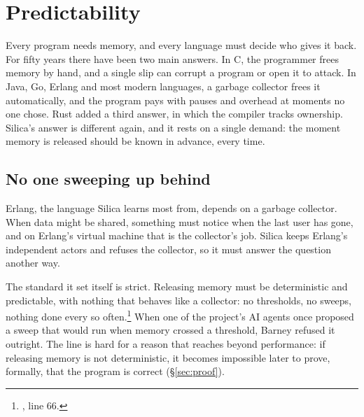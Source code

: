 \chapter{Predictability}
\label{ch:memory}

Every program needs memory, and every language must decide who gives it back.
For fifty years there have been two main answers. In C, the programmer frees
memory by hand, and a single slip can corrupt a program or open it to attack.
In Java, Go, Erlang and most modern languages, a garbage collector frees it
automatically, and the program pays with pauses and overhead at moments no one
chose. Rust added a third answer, in which the compiler tracks ownership.
Silica's answer is different again, and it rests on a single demand: the
moment memory is released should be known in advance, every time.

\section{No one sweeping up behind}

Erlang, the language Silica learns most from, depends on a garbage collector.
When data might be shared, something must notice when the last user has gone,
and on Erlang's virtual machine that is the collector's job. Silica keeps
Erlang's independent actors and refuses the collector, so it must answer the
question another way.

The standard it set itself is strict. Releasing memory must be deterministic
and predictable, with nothing that behaves like a collector: no thresholds, no
sweeps, nothing done every so
often.\footnote{, line 66.}
When one of the project's AI agents once proposed a sweep that would run when
memory crossed a threshold, Barney refused it outright. The line is hard for a
reason that reaches beyond performance: if releasing memory is not
deterministic, it becomes impossible later to prove, formally, that the program
is correct (\S\ref{sec:proof}).

